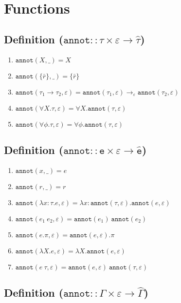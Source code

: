 \documentclass{llncs}
\newcommand{\keywadj}[1]{\mathtt{#1}}
\newcommand{\kwa}[1]{\keywadj{ #1 }}
\newcommand{\annot}[2]{
	\keywadj{annot}(#1, #2)
}
\newcommand{\poly}[2]{
	\forall #1. #2
}
\begin{document}
\section{Functions}

\subsection*{Definition ($\kwa{annot :: \tau \times \varepsilon \rightarrow \hat \tau}$)}

\begin{enumerate}
	\item $\annot{X}{\_} = X$
	\item $\annot{\{ \bar r \}}{\_} = \{ \bar r \}$
	\item $\annot{\tau_1 \rightarrow \tau_2}{\varepsilon} = \annot{\tau_1}{\varepsilon} \rightarrow_{\varepsilon} \annot{\tau_2}{\varepsilon}$
	\item $\annot{\poly{X}{\tau}}{\varepsilon} = \poly{X}{\annot{\tau}{\varepsilon}}$
	\item $\annot{\poly{\phi}{\tau}}{\varepsilon} = \poly{\phi}{\annot{\tau}{\varepsilon}}$
\end{enumerate}


\subsection*{Definition ($\kwa{annot :: e \times \varepsilon \rightarrow \hat e}$)}

\begin{enumerate}
	\item $\kwa{annot}(x, \_) = e$
	\item $\kwa{annot}(r, \_) = r$
	\item $\kwa{annot}(\lambda x: \tau.e, \varepsilon) = \lambda x: \kwa{annot}(\tau, \varepsilon) . \kwa{annot}(e, \varepsilon)$
	\item $\kwa{annot}(e_1~e_2, \varepsilon) = \kwa{annot}(e_1)~\kwa{annot}(e_2)$
	\item $\kwa{annot}(e.\pi, \varepsilon) = \annot{e}{\varepsilon}.\pi$
	\item $\annot{\lambda X. e}{\varepsilon} = \lambda X. \annot{e}{\varepsilon}$
	\item $\annot{e~\tau}{\varepsilon} = \annot{e}{\varepsilon}~\annot{\tau}{\varepsilon}$
\end{enumerate}

\subsection*{Definition ($\kwa{annot :: \Gamma \times \varepsilon \rightarrow \hat \Gamma}$)}
\end{document}
